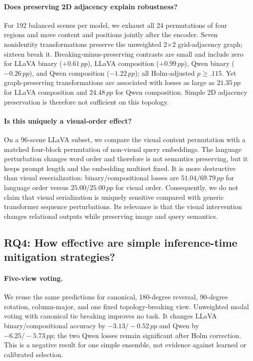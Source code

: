 \documentclass[10pt,twocolumn,letterpaper]{article}
\newcommand{\pp}{\,pp}
\begin{document}
\paragraph{Does preserving 2D adjacency explain robustness?}
For 192 balanced scenes per model, we exhaust all 24 permutations of four regions and move content and positions jointly after the encoder.
Seven nonidentity transformations preserve the unweighted 2$\times$2 grid-adjacency graph; sixteen break it.
Breaking-minus-preserving contrasts are small and include zero for LLaVA binary ($+0.61\pp$), LLaVA composition ($+0.99\pp$), Qwen binary ($-0.26\pp$), and Qwen composition ($-1.22\pp$); all Holm-adjusted $p\geq .115$.
Yet graph-preserving transformations are associated with losses as large as $21.35\pp$ for LLaVA composition and $24.48\pp$ for Qwen composition.
Simple 2D adjacency preservation is therefore not sufficient on this topology.

\paragraph{Is this uniquely a visual-order effect?}
On a 96-scene LLaVA subset, we compare the visual content permutation with a matched four-block permutation of non-visual query embeddings.
The language perturbation changes word order and therefore is not semantics preserving, but it keeps prompt length and the embedding multiset fixed.
It is more destructive than visual reserialization: binary/compositional losses are $51.04/69.79\pp$ for language order versus $25.00/25.00\pp$ for visual order.
Consequently, we do not claim that visual serialization is uniquely sensitive compared with generic transformer sequence perturbations.
Its relevance is that the visual intervention changes relational outputs while preserving image and query semantics.

\subsection{RQ4: How effective are simple inference-time mitigation strategies?}

\paragraph{Five-view voting.}
We reuse the same predictions for canonical, 180-degree reversal, 90-degree rotation, column-major, and one fixed topology-breaking view.
Unweighted modal voting with canonical tie breaking improves no task.
It changes LLaVA binary/compositional accuracy by $-3.13/-0.52\pp$ and Qwen by $-6.25/-5.73\pp$; the two Qwen losses remain significant after Holm correction.
This is a negative result for one simple ensemble, not evidence against learned or calibrated selection.
\end{document}
